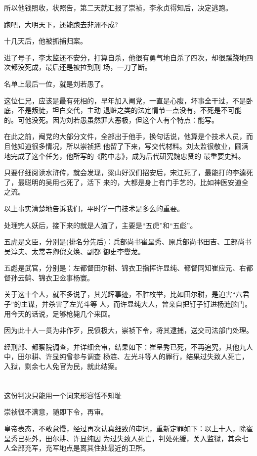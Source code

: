 \documentclass[11pt,a4paper,onecolumn]{article}
\begin{document}
所以他钱照收，状照告，第二天就汇报了崇祯，李永贞得知后，决定逃跑。

跑吧，大明天下，还能跑去非洲不成?

十几天后，他被抓捕归案。

进了号子，李太监还不安分，打算自杀，他很有勇气地自杀了四次，却很蹊跷地四次都没死成，最后还是被拉到刑
场，一刀了断。

名单上最后一位，就是刘若愚了。

这位仁兄，应该是最有死相的，早年加入阉党，一直是心腹，坏事全干过，不是卧底，不是叛徒，坦白交代，主动
退赃之类的法定情节一点没有，不死是不可能的。可他没死。因为刘若愚虽然罪大恶极，但这个人有个特点：能写。

在此之前，阉党的大部分文件，全部出于他手，换句话说，他算是个技术人员，而且他知道很多情况，所以崇祯把
他留了下来，写交代材料。刘太监很敬业，圆满地完成了这个任务，他所写的《酌中志》，成为后代研究魏忠贤的
最重要史料。

只要仔细阅读水浒传，就会发现，梁山好汉们招安后，宋江死了，最能打的李逵死了，最聪明的吴用也死了，活下
来的，大都是身上有门手艺的，比如神医安道全之流。

以上事实清楚地告诉我们，平时学一门技术是多么的重要。

处理完人妖后，接下来的就是人渣了，主要是``五虎''和``五彪''。

五虎是文臣，分别是(排名分先后)：兵部尚书崔呈秀、原兵部尚书田吉、工部尚书吴淳夫、太常寺卿倪文焕、副都
御史李燮龙。

五彪是武官，分别是：左都督田尔耕、锦衣卫指挥许显纯、都督同知崔应元、右都督孙云鹤、锦衣卫佥事杨寰。

关于这十个人，就不多说了，其光辉事迹，不胜枚举，比如田尔耕，是迫害``六君子''的主谋，并杀害了左光斗等
人，而许显纯大人，曾亲自把钉子钉进杨涟脑门。用今天的话说，足够枪毙几个来回。

因为此十人一贯为非作歹，民愤极大，崇祯下令，将其逮捕，送交司法部门处理。

经刑部、都察院调查，并详细会审，结果如下：崔呈秀已死，不再追究，其他九人中，田尔耕、许显纯曾参与调查
杨涟、左光斗等人的罪行，结果过失致人死亡，入狱，剩余七人免官为民，就此结案。

\section[\thesection]{}

这份判决只能用一个词来形容\myrule 恬不知耻

崇祯很不满意，随即下令，再审。

皇帝表态，不敢怠慢，经过再次认真细致的审讯，重新定罪如下：以上十人，除崔呈秀已死外，田尔耕、许显纯因
为过失致人死亡，判处死缓，关入监狱，其余七人全部充军，充军地点是离其住处最近的卫所。
\end{document}
